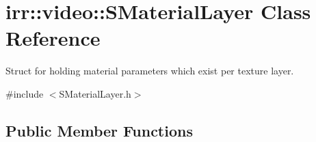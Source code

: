 \hypertarget{classirr_1_1video_1_1SMaterialLayer}{}\section{irr\+:\+:video\+:\+:S\+Material\+Layer Class Reference}
\label{classirr_1_1video_1_1SMaterialLayer}


Struct for holding material parameters which exist per texture layer.  




{\ttfamily \#include $<$S\+Material\+Layer.\+h$>$}

\subsection*{Public Member Functions}
